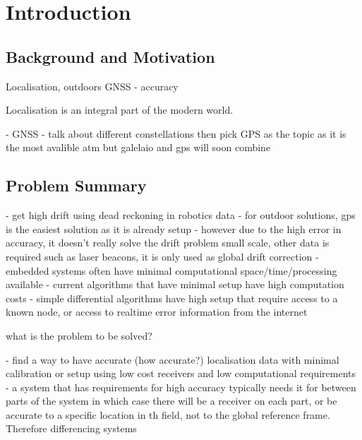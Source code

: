 
\def\chapdir{./ChapterIntro}

\chapter{Introduction} \label{ch:intro}



\section{Background and Motivation}
Localisation, outdoors GNSS
- accuracy 

Localisation is an integral part of the modern world.

- GNSS - talk about different constellations then pick GPS as the topic as it is the most avalible atm but galelaio and gps will soon combine








\section{Problem Summary}
- get high drift using dead reckoning in robotics data
- for outdoor solutions, gps is the easiest solution as it is already setup
- however due to the high error in accuracy, it doesn't really solve the drift problem small scale, other data is required such as laser beacons, it is only used as global drift correction
- embedded systems often have minimal computational space/time/processing available 
- current algorithms that have minimal setup have high computation costs
- simple differential algorithms have high setup that require access to a known node, or access to realtime error information from the internet


what is the problem to be solved?

- find a way to have accurate (how accurate?) localisation data with minimal calibration or setup using low cost receivers and low computational requirements  
- a system that has requirements for high accuracy typically needs it for between parts of the system in which case there will be a receiver on each part, or be accurate to a specific location in th field, not to the global reference frame. Therefore differencing systems

